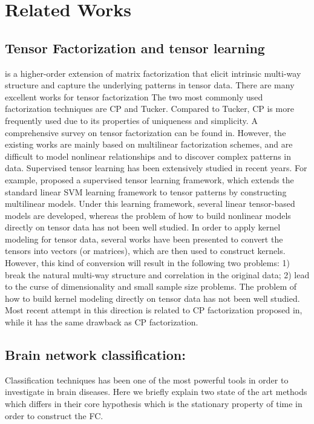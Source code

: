\documentclass[journal]{IEEEtran}
\begin{document}
	
	\section{Related Works}
	
	
	\subsection{Tensor Factorization and tensor learning} 
	is a higher-order extension of matrix
	factorization that elicit intrinsic multi-way structure and capture the underlying patterns in tensor data. There are
	many excellent works for tensor factorization The two most commonly used factorization techniques are CP and Tucker. Compared to Tucker, CP is more frequently used due to its properties of uniqueness and simplicity. A comprehensive survey on
	tensor factorization can be found in. However, the existing works are mainly based on multilinear factorization schemes, and are difficult to model nonlinear relationships and to discover complex patterns in data.
	Supervised tensor learning has been extensively studied
	in recent years. For example, proposed a supervised
	tensor learning framework, which extends the standard
	linear SVM learning framework to tensor patterns by constructing multilinear models. Under this learning framework,
	several linear tensor-based models
	are developed, whereas the problem of how to build nonlinear
	models directly on tensor data has not been well studied.
	In order to apply kernel modeling for tensor data, several
	works have been presented to convert
	the tensors into vectors (or matrices), which are then
	used to construct kernels. However, this kind of conversion
	will result in the following two problems: 1) break
	the natural multi-way structure and correlation in the original
	data; 2) lead to the curse of dimensionality and
	small sample size problems. The problem of how to
	build kernel modeling directly on tensor data has not been
	well studied. Most recent attempt in this direction is related
	to CP factorization proposed in, while it has the same
	drawback as CP factorization.
	
	\subsection{Brain network classification:}
	Classification techniques has been one of the most powerful tools in order to investigate in brain diseases. Here we briefly explain two state of the art methods which differs in their core hypothesis which is the stationary property of time in order to construct the FC.  
	
\end{document}
